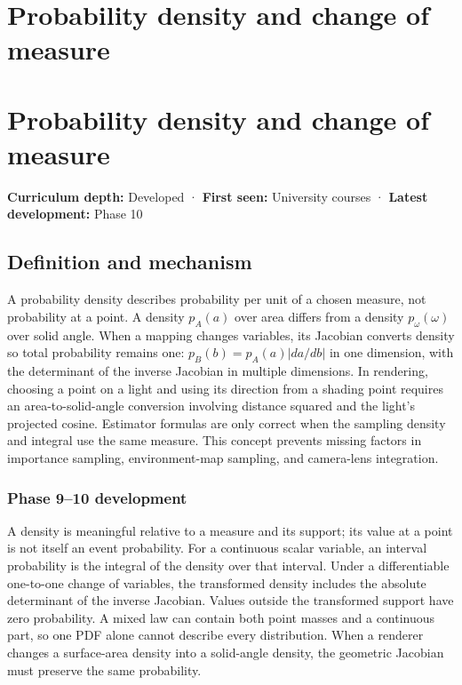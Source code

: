 \hypertarget{appendix-4815cd87ab8b}{}
\section*{Probability density and change of measure}
\section{Probability density and change of measure}\label{appendix-4815cd87ab8b-probability-density-and-change-of-measure}

\textbf{Curriculum depth:} Developed · \textbf{First seen:} University courses · \textbf{Latest development:} Phase 10

\subsection{Definition and mechanism}\label{appendix-4815cd87ab8b-definition-and-mechanism}

A probability density describes probability per unit of a chosen measure, not probability at a point. A density \(p_A(a)\) over area differs from a density \(p_\omega(\omega)\) over solid angle. When a mapping changes variables, its Jacobian converts density so total probability remains one: \(p_B(b)=p_A(a)|da/db|\) in one dimension, with the determinant of the inverse Jacobian in multiple dimensions. In rendering, choosing a point on a light and using its direction from a shading point requires an area-to-solid-angle conversion involving distance squared and the light's projected cosine. Estimator formulas are only correct when the sampling density and integral use the same measure. This concept prevents missing factors in importance sampling, environment-map sampling, and camera-lens integration.

\subsubsection{Phase 9--10 development}\label{appendix-4815cd87ab8b-phase-910-development}

A density is meaningful relative to a measure and its support; its value at a point is not itself an event probability. For a continuous scalar variable, an interval probability is the integral of the density over that interval. Under a differentiable one-to-one change of variables, the transformed density includes the absolute determinant of the inverse Jacobian. Values outside the transformed support have zero probability. A mixed law can contain both point masses and a continuous part, so one PDF alone cannot describe every distribution. When a renderer changes a surface-area density into a solid-angle density, the geometric Jacobian must preserve the same probability.

